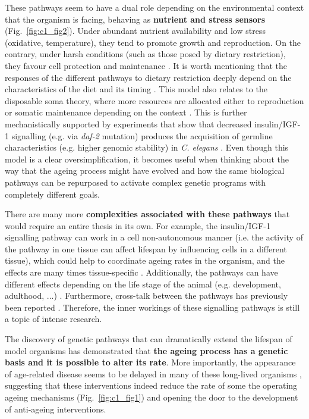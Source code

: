 \bigskip

These pathways seem to have a dual role depending on the environmental context that the organism is facing, behaving as \textbf{nutrient and stress sensors} (Fig.~\ref{fig:c1_fig2}). Under abundant nutrient availability and low stress (oxidative, temperature), they tend to promote growth and reproduction. On the contrary, under harsh conditions (such as those posed by dietary restriction), they favour cell protection and maintenance \cite{Kenyon2005,Kenyon2010}. It is worth mentioning that the responses of the different pathways to dietary restriction deeply depend on the characteristics of the diet and its timing \cite{Kenyon2010}. This model also relates to the disposable soma theory, where more resources are allocated either to reproduction or somatic maintenance depending on the context \cite{Kirkwood1977,Kirkwood1991}. This is further mechanistically supported by experiments that show that decreased insulin/IGF-1 signalling (e.g. via \textit{daf-2} mutation) produces the acquisition of germline characteristics (e.g. higher genomic stability) in \textit{C. elegans} \cite{Curran2009}. Even though this model is a clear oversimplification, it becomes useful when thinking about the way that the ageing process might have evolved and how the same biological pathways can be repurposed to activate complex genetic programs with completely different goals.

\bigskip

There are many more \textbf{complexities associated with these pathways} that would require an entire thesis in its own. For example, the insulin/IGF-1 signalling pathway can work in a cell non-autonomous manner (i.e. the activity of the pathway in one tissue can affect lifespan by influencing cells in a different tissue), which could help to coordinate ageing rates in the organism, and the effects are many times tissue-specific \cite{Kenyon2005,Kenyon2010}. Additionally, the pathways can have different effects depending on the life stage of the animal (e.g. development, adulthood, ...) \cite{Dillin2002}. Furthermore, cross-talk between the pathways has previously been reported \cite{Bonkowski2016, Greer2007}. Therefore, the inner workings of these signalling pathways is still a topic of intense research.

\bigskip

The discovery of genetic pathways that can dramatically extend the lifespan of model organisms has demonstrated that \textbf{the ageing process has a genetic basis and it is possible to alter its rate}. More importantly, the appearance of age-related disease seems to be delayed in many of these long-lived organisms \cite{Kenyon2010,Arantes-Oliveira2003}, suggesting that these interventions indeed reduce the rate of some the operating ageing mechanisms (Fig.~\ref{fig:c1_fig1}) and opening the door to the development of anti-ageing interventions. 

